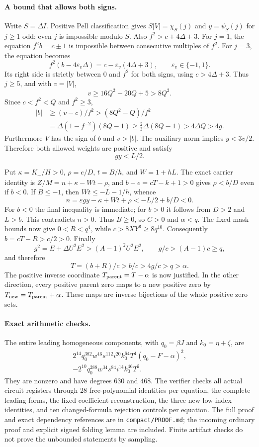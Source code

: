 \paragraph{A bound that allows both signs.}
Write $S=\Delta I$. Positive Pell classification gives
$S|V|=\chi_S(j)$ and $y=\psi_S(j)$ for $j\ge1$ odd; even $j$
is impossible modulo $S$. Also $f^2>c+4\Delta+3$.
For $j=1$, the equation $f^2b=c\pm1$ is impossible between consecutive
multiples of $f^2$. For $j=3$, the equation becomes
\[
 f^2(b-4\varepsilon_v\Delta)
     =c-\varepsilon_v(4\Delta+3),\qquad\varepsilon_v\in\{-1,1\}.
\]
Its right side is strictly between $0$ and $f^2$ for both signs, using
$c>4\Delta+3$. Thus $j\ge5$, and with $v=|V|$,
\[
 v\ge16Q^2-20Q+5>8Q^2.
\]
Since $c<f^2<Q$ and $f^2\ge3$,
\begin{align*}
 |b|&\ge(v-c)/f^2>(8Q^2-Q)/f^2\\
 &=\Delta(1-f^{-2})(8Q-1)
   \ge\tfrac23\Delta(8Q-1)>4\Delta Q>4g.
\end{align*}
Furthermore $V$ has the sign of $b$ and $v>|b|$. The auxiliary norm
implies $y<3v/2$. Therefore both allowed weights are positive and satisfy
\[
 gy<L/2.
\]

Put $\kappa=K_+/H>0$, $\rho=e/D$, $t=B/h$, and $W=1+hL$.
The exact carrier identity is
$Z/M=n+\kappa-Wt-\rho$, and
$b-e=cT-k+1>0$ gives $\rho<b/D$ even if $b<0$.
If $B\le-1$, then $Wt\le-L-1/h$, whence
\[
 n=\varepsilon gy-\kappa+Wt+\rho<-L/2+b/D<0.
\]
For $b<0$ the final inequality is immediate; for $b>0$ it follows from
$D>2$ and $L>b$. This contradicts $n>0$. Thus $B\ge0$, so $C>0$ and
$\alpha<q$. The fixed mask bounds now give $0<R<q^4$, while
$c>8XY^3\ge8q^{10}$. Consequently $b=cT-R>c/2>0$.
Finally
\[
 g^2=E+\Delta U^2E^2>(A-1)^2U^2E^2,
 \qquad g/c>(A-1)c\ge q,
\]
and therefore
\[
 T=(b+R)/c>b/c>4g/c>q>\alpha.
\]
The positive inverse coordinate $T_{\rm parent}=T-\alpha$ is now
justified. In the other direction, every positive parent zero maps to a
new positive zero by $T_{\rm new}=T_{\rm parent}+\alpha$. These maps
are inverse bijections of the whole positive zero sets.

\paragraph{Exact arithmetic checks.}
The entire leading homogeneous components, with $q_0=\beta J$ and
$k_0=\eta+\zeta$, are
\begin{gather*}
 2^{14}q_0^{382}w^{46}s^{112}i^{20}k_0^{64}T^4
       (q_0-F-\alpha)^2,\\
 -2^{10}q_0^{288}w^{34}s^{84}i^{14}k_0^{46}T^2.
\end{gather*}
They are nonzero and have degrees $630$ and $468$. The verifier checks
all actual circuit registers through 28 free-polynomial identities per
equation, the complete leading forms, the fixed coefficient reconstruction,
the three new low-index identities, and ten changed-formula rejection
controls per equation. The full proof and exact dependency references are
in \texttt{compact/PROOF.md}; the incoming ordinary proof and explicit
signed folding lemma are included. Finite artifact checks do not prove the
unbounded statements by sampling.

